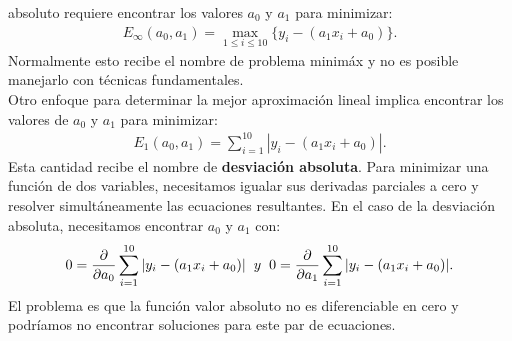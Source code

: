 absoluto requiere encontrar los valores $a_0$ y $a_1$ para minimizar:
\begin{align*}
  E_{\infty}(a_0,a_1)=\max_{1\leq i\leq 10}\{y_i-(a_1x_i+a_0)\}.
\end{align*}
Normalmente esto recibe el nombre de problema minimáx y no es posible manejarlo con técnicas fundamentales.\\
Otro enfoque para determinar la mejor aproximación lineal implica encontrar los valores de $a_0$ y $a_1$ para minimizar: 
\begin{align*}
  E_1(a_0,a_1)=\sum_{i=1}^{10}|y_i-(a_1x_i+a_0)|.
\end{align*}
Esta cantidad recibe el nombre de \textbf{desviación absoluta}. Para minimizar una función de dos variables, necesitamos igualar sus derivadas parciales a cero y resolver simultáneamente las ecuaciones resultantes. En el caso de la desviación absoluta, necesitamos encontrar $a_0$ y $a_1$ con:
\begin{align*}
  0=\frac{\partial }{\partial a_0}\sum_{i=1}^{10}|y_i-(a_1x_i+a_0)|\hspace{0.2cm}y\hspace{0.2cm}0=\frac{\partial }{\partial a_1}\sum_{i=1}^{10}|y_i-(a_1x_i+a_0)|.
\end{align*}
El problema es que la función valor absoluto no es diferenciable en cero y podríamos no encontrar soluciones para este par de ecuaciones.
